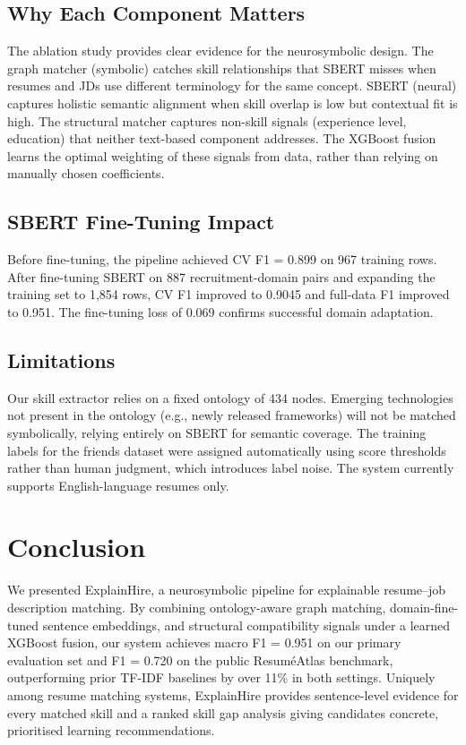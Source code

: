 \documentclass[conference]{IEEEtran}
\begin{document}
\subsection{Why Each Component Matters}
The ablation study provides clear evidence for the neurosymbolic design.
The graph matcher (symbolic) catches skill relationships that SBERT misses
when resumes and JDs use different terminology for the same concept. SBERT
(neural) captures holistic semantic alignment when skill overlap is low but
contextual fit is high. The structural matcher captures non-skill signals
(experience level, education) that neither text-based component addresses.
The XGBoost fusion learns the optimal weighting of these signals from data,
rather than relying on manually chosen coefficients.

\subsection{SBERT Fine-Tuning Impact}
Before fine-tuning, the pipeline achieved CV F1 = 0.899 on 967 training
rows. After fine-tuning SBERT on 887 recruitment-domain pairs and expanding
the training set to 1,854 rows, CV F1 improved to 0.9045 and full-data F1
improved to 0.951. The fine-tuning loss of 0.069 confirms successful
domain adaptation.

\subsection{Limitations}
Our skill extractor relies on a fixed ontology of 434 nodes. Emerging
technologies not present in the ontology (e.g., newly released frameworks)
will not be matched symbolically, relying entirely on SBERT for semantic
coverage. The training labels for the friends dataset were assigned
automatically using score thresholds rather than human judgment, which
introduces label noise. The system currently supports English-language
resumes only.

\section{Conclusion}

We presented ExplainHire, a neurosymbolic pipeline for explainable
resume--job description matching. By combining ontology-aware graph
matching, domain-fine-tuned sentence embeddings, and structural compatibility
signals under a learned XGBoost fusion, our system achieves macro F1 = 0.951
on our primary evaluation set and F1 = 0.720 on the public ResuméAtlas
benchmark, outperforming prior TF-IDF baselines by over 11\% in both
settings. Uniquely among resume matching systems, ExplainHire provides
sentence-level evidence for every matched skill and a ranked skill gap
analysis giving candidates concrete, prioritised learning recommendations.
\end{document}
